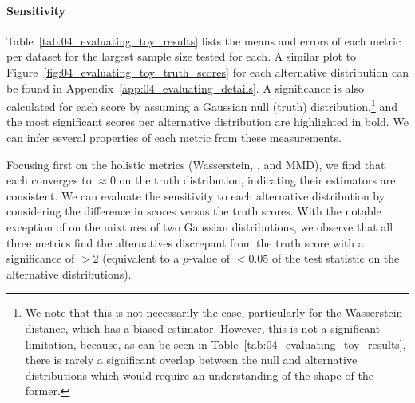 \paragraph{Sensitivity}

Table~\ref{tab:04_evaluating_toy_results} lists the means and errors of each metric per dataset for the largest sample size tested for each.
A similar plot to Figure~\ref{fig:04_evaluating_toy_truth_scores} for each alternative distribution can be found in Appendix~\ref{app:04_evaluating_details}.
A significance is also calculated for each score by assuming a Gaussian null (truth) distribution,\footnote{We note that this is not necessarily the case, particularly for the Wasserstein distance, which has a biased estimator. 
However, this is not a significant limitation, because, as can be seen in Table~\ref{tab:04_evaluating_toy_results}, there is rarely a significant overlap between the null and alternative distributions which would require an understanding of the shape of the former.}
and the most significant scores per alternative distribution are highlighted in bold.
We can infer several properties of each metric from these measurements.

\begin{table}
    \centering
    \caption[Values, significances, and errors of metrics, as defined in Section~\ref{sec:04_evaluating_toydata_metrics}, for each (mixture of) Gaussian distribution(s), for the largest sample size tested.]
    {Values, significances, and errors of metrics, as defined in Section~\ref{sec:04_evaluating_toydata_metrics}, for each (mixture of) Gaussian distribution(s), for the largest sample size tested.
    The most significant scores per distribution are in bold.
    \label{tab:04_evaluating_toy_results} 
    }
    \scriptsize
    \centering{}
\end{table}

Focusing first on the holistic metrics (Wasserstein, \fgdinf, and MMD), we find that each converges to ${\approx}0$ on the truth distribution, indicating their estimators are consistent.
We can evaluate the sensitivity to each alternative distribution by considering the difference in scores versus the truth scores.
With the notable exception of \fgdinf on the mixtures of two Gaussian distributions, we observe that all three metrics find the alternatives discrepant from the truth score with a significance of $>$2 (equivalent to a $p$-value of $<$0.05 of the test statistic on the alternative distributions).

